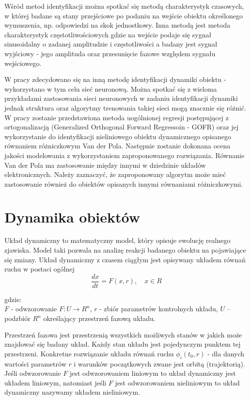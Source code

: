 	Wśród metod identyfikacji można spotkać się metodą charakterystyk czasowych, w której badane są stany przejściowe po podaniu na wejście obiektu określonego wymuszenia, np. odpowiedzi na skok jednostkowy. Inna metodą jest metoda charakterystyk częstotliwościowych gdzie na wejście podaje się sygnał sinusoidalny o zadanej amplitudzie i częstotliwości a badany jest sygnał wyjściowy - jego amplituda oraz przesunięcie fazowe względem sygnału wejściowego\cite{Czemplik}.
	
	W pracy zdecydowano się na inną metodę identyfikacji dynamiki obiektu - wykorzystano w tym celu sieć neuronową. Można spotkać się z wieloma przykładami zastosowania sieci neuronowych w zadaniu identyfikacji dynamiki jednak struktura oraz algorytmy trenowania takiej sieci  mogą znacznie się różnić. W pracy zostanie przedstawiona metoda uogólnionej regresji postępującej z ortogonalizacją (Generalized Orthogonal Forward Regressoin - GOFR) oraz jej wykorzystanie do identyfikacji nieliniowego obiektu dynamicznego opisanego równaniem różniczkowym Van der Pola. Następnie zostanie dokonana ocena jakości modelowania z wykorzystaniem zaproponowanego rozwiązania. Równanie Van der Pola ma zastosowanie między innymi w dziedzinie układów elektronicznych\cite{Palczewski}. Należy zaznaczyć, że zaproponowany algorytm może mieć zastosowanie również do obiektów opisanych innymi równaniami różniczkowymi.  

\newpage
\section{Dynamika obiektów}
Układ dynamiczny to matematyczny model, który opisuje ewolucję realnego zjawiska. Model taki pozwala na analizę reakcji badanego obiektu na pojawiające się zmiany.
Układ dynamiczny z czasem ciągłym jest opisywany układem równań ruchu w postaci ogólnej\cite{Kosinski}
\begin{equation}
	\frac{dx}{dt} = F(x,r), \quad x \in R
\end{equation}

gdzie: \\
$F$ - odwzorowanie $F:U \rightarrow R^n$,
$r$ - zbiór parametrów kontrolnych układu,
$U$ – podzbiór $R^n$ określający przestrzeń fazową układu.

Przestrzeń fazowa jest przestrzenią wszystkich możliwych stanów w jakich może znajdować się badany układ. Każdy stan układu jest pojedynczym punktem tej przestrzeni. Konkretne rozwiązanie układu równań ruchu $\phi_i(t_0,r)$ - dla danych wartości parametrów $r$ i warunków początkowych zwane jest orbitą (trajektorią). Jeśli odwzorowanie $F$ jest odwzorowaniem liniowym to układ dynamiczny jest układem liniowym, natomiast jeśli $F$ jest odwzorowaniem nieliniowym to układ dynamiczny nazywamy układem nieliniowym.

